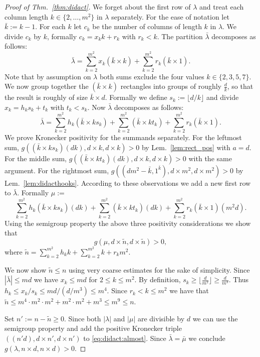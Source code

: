 \documentclass{article}
\numberwithin{equation}{section}
\theoremstyle{definition}
\def\la{\lambda}
\begin{document}
\begin{proof}[Proof of Thm.~\ref{thm:didact}]
We forget about the first row of $\la$ and treat each column length $k \in \{2,\ldots,m^2\}$ in $\la$ separately.
For the ease of notation let $\bar k := k-1$.
For each $k$ let $c_k$ be the number of columns of length $k$ in $\la$.
We divide $c_k$ by $k$, formally $c_k = x_k k + r_k$ with $r_k < k$.
The partition $\bar\la$ decomposes as follows:
\[
\bar\la = \sum_{k=2}^{m^2} x_k (\bar k\times k) + \sum_{k=2}^{m^2} r_k (\bar k \times 1).
\]
Note that by assumption on $\la$ both sums exclude the four values $k \in \{2,3,5,7\}$.
We now group together the $(\bar k\times k)$ rectangles into groups of roughly $\frac d k$,
so that the result is roughly of size $\bar k\times d$.
Formally we define $s_k := \lfloor d/k\rfloor$ and divide $x_k = h_k s_k + t_k$ with $t_k < s_k$.
Now $\bar\la$ decomposes as follows:
\[
\bar\la = \sum_{k=2}^{m^2} h_k (\bar k\times k s_k)
+ \sum_{k=2}^{m^2} (\bar k\times k t_k)
+ \sum_{k=2}^{m^2} r_k (\bar k\times 1).
\]
We prove  Kronecker positivity for the summands separately.
For the leftmost sum, $g((\bar k\times k s_k)(dk),d \times k, d \times k)>0$ by Lem.~\ref{lem:rect_pos} with $a=d$.
For the middle sum, $g((\bar k\times k t_k)(dk),d \times k, d \times k)>0$ with the same argument.
For the rightmost sum, $g( (dm^2-\bar k,1^{\bar k}),d \times m^2, d \times m^2)>0$ by Lem.~\ref{lem:didacthooks}.
According to these observations we add a new first row to $\bar\la$. Formally $\mu:=$
\[
\sum_{k=2}^{m^2} h_k (\bar k\times k s_k)(dk)
+ \sum_{k=2}^{m^2} (\bar k\times k t_k)(dk)
+ \sum_{k=2}^{m^2} r_k (\bar k\times 1)(m^2 d).
\]
Using the semigroup property the above three positivity considerations we show that
\begin{equation}\label{eq:didact:almost}
g(\mu, d \times \tilde n, d \times \tilde n) > 0,
\end{equation}
where $\tilde n = \sum_{k=2}^{m^2}h_k k + \sum_{k=2}^{m^2}k + r_k m^2$.

We now show $\tilde n \leq n$ using very coarse estimates for the sake of simplicity.
Since $|\bar\la| \leq md$ we have $x_k \leq md$ for $2 \leq k \leq m^2$.
By definition,  $s_k \geq \lfloor \frac d {m^2} \rfloor \geq \frac d {m^3}$.
Thus $h_k \leq x_k/s_k \leq md/(d/m^3) \leq m^4$.
Since $r_k < k \leq m^2$ we have that
$\tilde n \leq m^4\cdot m^2\cdot m^2 + m^2 \cdot m^2 + m^3 \leq m^9 \leq n$.


Set $n' := n-\tilde n \geq 0$.
Since both $|\la|$ and $|\mu|$ are divisible by $d$
we can use the semigroup property and add the positive Kronecker triple
$((n' d),d \times n', d \times n')$ to \eqref{eq:didact:almost}.
Since $\bar\la=\bar\mu$ we conclude
$g(\la,n\times d, n\times d)>0$.
\end{proof}
\end{document}
